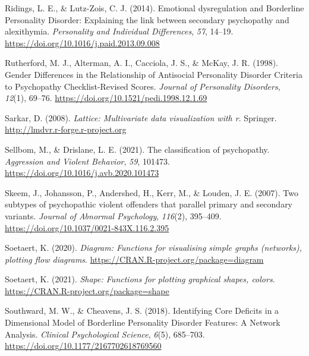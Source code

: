 \documentclass[
  man,floatsintext]{apa7}
\newlength{\cslhangindent}
\newlength{\cslentryspacingunit} %
\newenvironment{CSLReferences}[2] %
 {%
  \setlength{\parindent}{0pt}
  \ifodd #1
  \let\oldpar\par
  \def\par{\hangindent=\cslhangindent\oldpar}
  \fi
  \setlength{\parskip}{#2\cslentryspacingunit}
 }%
 {}
\begin{document}
\begin{CSLReferences}{1}{0}
\leavevmode{}%
Ridings, L. E., \& Lutz-Zois, C. J. (2014). Emotional dysregulation and {Borderline Personality Disorder}: {Explaining} the link between secondary psychopathy and alexithymia. \emph{Personality and Individual Differences}, \emph{57}, 14--19. \url{https://doi.org/10.1016/j.paid.2013.09.008}

\leavevmode{}%
Rutherford, M. J., Alterman, A. I., Cacciola, J. S., \& McKay, J. R. (1998). Gender {Differences} in the {Relationship} of {Antisocial Personality Disorder Criteria} to {Psychopathy Checklist-Revised Scores}. \emph{Journal of Personality Disorders}, \emph{12}(1), 69--76. \url{https://doi.org/10.1521/pedi.1998.12.1.69}

\leavevmode{}%
Sarkar, D. (2008). \emph{Lattice: Multivariate data visualization with r}. Springer. \url{http://lmdvr.r-forge.r-project.org}

\leavevmode{}%
Sellbom, M., \& Drislane, L. E. (2021). The classification of psychopathy. \emph{Aggression and Violent Behavior}, \emph{59}, 101473. \url{https://doi.org/10.1016/j.avb.2020.101473}

\leavevmode{}%
Skeem, J., Johansson, P., Andershed, H., Kerr, M., \& Louden, J. E. (2007). Two subtypes of psychopathic violent offenders that parallel primary and secondary variants. \emph{Journal of Abnormal Psychology}, \emph{116}(2), 395--409. \url{https://doi.org/10.1037/0021-843X.116.2.395}

\leavevmode{}%
Soetaert, K. (2020). \emph{Diagram: Functions for visualising simple graphs (networks), plotting flow diagrams}. \url{https://CRAN.R-project.org/package=diagram}

\leavevmode{}%
Soetaert, K. (2021). \emph{Shape: Functions for plotting graphical shapes, colors}. \url{https://CRAN.R-project.org/package=shape}

\leavevmode{}%
Southward, M. W., \& Cheavens, J. S. (2018). Identifying {Core Deficits} in a {Dimensional Model} of {Borderline Personality Disorder Features}: {A Network Analysis}. \emph{Clinical Psychological Science}, \emph{6}(5), 685--703. \url{https://doi.org/10.1177/2167702618769560}


\end{CSLReferences}
\end{document}
